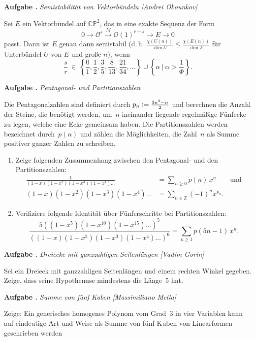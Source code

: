 \documentclass[a4paper,ngerman]{scrartcl}
\newcommand{\defeq}{\vcentcolon=}
\newlength{\aufgabenskip}
\newcounter{aufgabennummer}
\newenvironment{aufgabe}[1]{
  \addtocounter{aufgabennummer}{1}
  \textbf{Aufgabe \theaufgabennummer.} \emph{#1} \par
}{\vspace{\aufgabenskip}}
\begin{document}
\begin{aufgabe}{Semistabilität von Vektorbündeln [Andrei Okounkov]}
Sei $E$ ein Vektorbündel auf $\mathbb{CP}^2$, das in eine exakte Sequenz der
Form
\[
0 \longrightarrow \mathcal{O}^s \stackrel{M}{\longrightarrow} \mathcal{O}(1)^{r+s} \longrightarrow E \longrightarrow 0
\]
passt. Dann ist $E$ genau dann semistabil (d.\,h. $\tfrac{\chi(U(n))}{\dim U}\leq\tfrac{\chi(E(n))}{\dim E}$ für Unterbündel $U$ von $E$ und große $n$), wenn 
\[
\frac{s}{r}\ \in\
\left\{\frac{0}{1},\frac{1}{2},\frac{3}{5},\frac{8}{13},\frac{21}{34},\ldots
\right\} \cup \left\{ \alpha\ |\ \alpha > \frac{1}{\Phi} \right\}. \]
\end{aufgabe}

\begin{aufgabe}{Pentagonal- und Partitionszahlen}
Die Pentagonalzahlen sind definiert durch $p_n \defeq \tfrac{3n^2-n}{2}$ und
berechnen die Anzahl der Steine, die benötigt werden, um~$n$ ineinander
liegende regelmäßige Fünfecke zu legen, welche eine Ecke gemeinsam haben. Die
Partitionszahlen werden bezeichnet durch~$p(n)$ und zählen die Möglichkeiten,
die Zahl~$n$ als Summe positiver ganzer Zahlen zu schreiben.
\begin{enumerate}
\item Zeige folgenden Zusammenhang zwischen den Pentagonal- und den
Partitionszahlen:
\begin{align*}
\frac{1}{(1-x)(1-x^2)(1-x^3)(1-x^4)\ldots} &= \sum_{n\geq 0} p(n) \,x^n \qquad\text{und} \\
(1-x)(1-x^2)(1-x^3)(1-x^4)\ldots &= \sum_{n \in \mathbb{Z}} (-1)^n x^{p_n}.
\end{align*}
\item Verifiziere folgende Identität über Fünferschritte bei Partitionszahlen:
\[
\frac{5\left((1-x^5)(1-x^{10})(1-x^{15})\ldots \right)^5 }{\left((1-x)(1-x^2)(1-x^3)(1-x^4)\ldots\right)^6} 
= \sum_{n\geq 1} p(5n-1)\,x^n. \]
\end{enumerate}
\end{aufgabe}

\begin{aufgabe}{Dreiecke mit ganzzahligen Seitenlängen [Vadim Gorin]}
Sei ein Dreieck mit ganzzahligen Seitenlängen und einem rechten Winkel gegeben.
Zeige, dass seine Hypothenuse mindestens die Länge~5 hat.
\end{aufgabe}

\begin{aufgabe}{Summe von fünf Kuben [Massimiliano Mella]}
Zeige: Ein generisches homogenes Polynom vom Grad~3 in vier Variablen kann auf
eindeutige Art und Weise als Summe von fünf Kuben von Linearformen geschrieben werden
\end{aufgabe}
\end{document}
